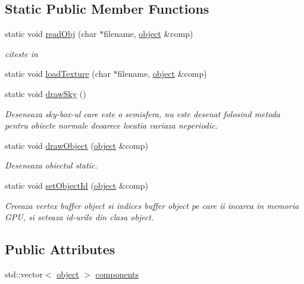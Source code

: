 \subsection*{Static Public Member Functions}
\begin{DoxyCompactItemize}
\item 
static void \hyperlink{class_static_obj_a6216559c49acd38e5907f31477a1a766}{read\-Obj} (char $\ast$filename, \hyperlink{structobject}{object} \&comp)
\begin{DoxyCompactList}\small\item\em citeste in \end{DoxyCompactList}\item 
static void \hyperlink{class_static_obj_ab313f0fbec00b84e213d768fc48bec16}{load\-Texture} (char $\ast$filename, \hyperlink{structobject}{object} \&comp)
\item 
static void \hyperlink{class_static_obj_aff189588cac999afa0c5df1481d1b2d6}{draw\-Sky} ()
\begin{DoxyCompactList}\small\item\em Deseneaza sky-\/box-\/ul care este o semisfera, nu este desenat folosind metoda pentru obiecte normale deoarece locatia variaza neperiodic. \end{DoxyCompactList}\item 
static void \hyperlink{class_static_obj_a5eb942a526132f44ca7318bfcafbfd1c}{draw\-Object} (\hyperlink{structobject}{object} \&comp)
\begin{DoxyCompactList}\small\item\em Deseneaza obiectul static. \end{DoxyCompactList}\item 
static void \hyperlink{class_static_obj_ae7e5cc75f69f16475c1a5215fe3d1509}{set\-Object\-Id} (\hyperlink{structobject}{object} \&comp)
\begin{DoxyCompactList}\small\item\em Creeaza vertex buffer object si indices buffer object pe care ii incarca in memoria G\-P\-U, si seteaza id-\/urile din clasa object. \end{DoxyCompactList}\end{DoxyCompactItemize}
\subsection*{Public Attributes}
\begin{DoxyCompactItemize}
\item 
std\-::vector$<$ \hyperlink{structobject}{object} $>$ \hyperlink{class_static_obj_a926bfb30d4479a9fc6eb2fe3eeadbabc}{components}
\end{DoxyCompactItemize}


